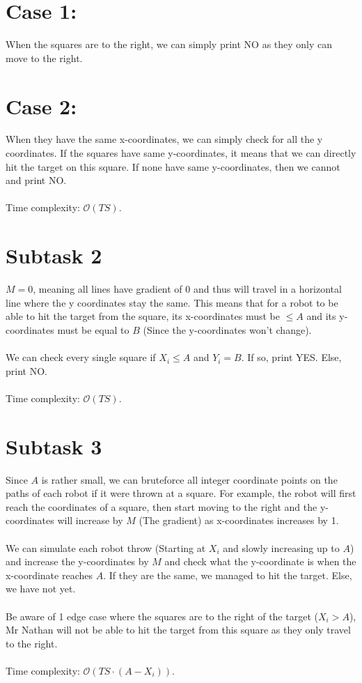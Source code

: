 \documentclass{report}
\begin{document}
\section*{Case 1:}
When the squares are to the right, we can simply print NO as they only can move to the right. 

\section*{Case 2:}
When they have the same x-coordinates, we can simply check for all the y coordinates. If the squares have same y-coordinates, it means that we can directly hit the target on this square. If none have same y-coordinates, then we cannot and print NO.
\\\\
Time complexity: $\mathcal{O}(TS)$.

\section*{Subtask 2}
$M = 0$, meaning all lines have gradient of 0 and thus will travel in a horizontal line where the y coordinates stay the same. This means that for a robot to be able to hit the target from the square, its x-coordinates must be $\leq A$ and its y-coordinates must be equal to $B$ (Since the y-coordinates won't change).
\\\\
We can check every single square if $X_i \leq A$ and $Y_i = B$. If so, print YES. Else, print NO.
\\\\
Time complexity: $\mathcal{O}(TS)$.

\section*{Subtask 3}
Since $A$ is rather small, we can bruteforce all integer coordinate points on the paths of each robot if it were thrown at a square. For example, the robot will first reach the coordinates of a square, then start moving to the right and the y-coordinates will increase by $M$ (The gradient) as x-coordinates increases by 1. 
\\\\
We can simulate each robot throw (Starting at $X_i$ and slowly increasing up to $A$) and increase the y-coordinates by $M$ and check what the y-coordinate is when the x-coordinate reaches $A$. If they are the same, we managed to hit the target. Else, we have not yet.
\\\\
Be aware of 1 edge case where the squares are to the right of the target ($X_i > A$), Mr Nathan will not be able to hit the target from this square as they only travel to the right.
\\\\
Time complexity: $\mathcal{O}(TS\cdot (A-X_i))$.
\end{document}
